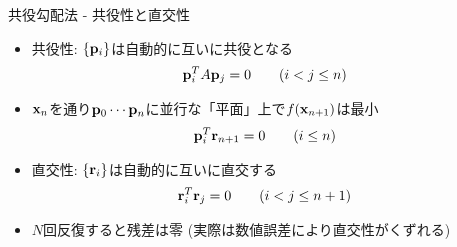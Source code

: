 \begin{frame}[t,fragile]{共役勾配法 - 共役性と直交性}
  \begin{itemize}
    \setlength{\itemsep}{1em}
  \item 共役性: $\{{\bf p}_i\}$は自動的に互いに共役となる
    \begin{align*}
      {\bf p}_i^T A {\bf p}_j &= 0 \qquad \text{($i < j \le n$)}
    \end{align*}
  \item ${\bf x}_n$を通り${\bf p}_0 \cdots {\bf p}_n$に並行な「平面」上で$f({\bf x}_{n+1})$は最小
    \begin{align*}
      {\bf p}_i^T {\bf r}_{n+1} &= 0 \qquad \text{($i \le n$)}
    \end{align*}
  \item 直交性: $\{{\bf r}_i\}$は自動的に互いに直交する
    \begin{align*}
      {\bf r}_i^T {\bf r}_j &= 0 \qquad \text{($i < j \le n+1$)}
    \end{align*}
  \item $N$回反復すると残差は零 (実際は数値誤差により直交性がくずれる)
  \end{itemize}
\end{frame}
